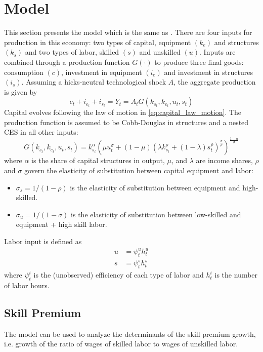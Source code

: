 \documentclass[12pt]{article}
\begin{document}
\pagebreak


\section{Model}\label{sec:model}

This section presents the model which is the same as \citep{krusell2000capital}. There are four inputs for production in this economy: two types of capital, equipment $(k_e)$ and structures $(k_s)$ and two types of labor, skilled $(s)$ and unskilled $(u)$. Inputs are combined through a production function $G(\cdot)$ to produce three final goods: consumption $(c)$, investment in equipment $(i_e)$ and investment in structures $(i_s)$. Assuming a hicks-neutral technological shock $A$, the aggregate production is given by
\begin{equation}\label{eq:production}
 c_t + i_{e_t} + i_{s_t} = Y_t = A_t G(k_{s_t}, k_{e_t}, u_t, s_t)
\end{equation}
Capital evolves following the law of motion in \eqref{eq:capital_law_motion}. The production function is assumed to be Cobb-Douglas in structures and a nested CES in all other inputs:
\begin{equation}\label{eq:production_fun}
 G(k_{s_t}, k_{e_t}, u_t, s_t) = k_{s_t}^\alpha\left( \mu u_t^\sigma + (1-\mu)\left(\lambda k_{s_t}^\rho + (1-\lambda)s_t^\rho\right)^\frac{\sigma}{\rho}\right)^\frac{1-\alpha}{\sigma}
\end{equation}
where $\alpha$ is the share of capital structures in output, $\mu$, and $\lambda$ are income shares, $\rho$ and $\sigma$ govern the elasticity of substitution between capital equipment and labor:
\begin{itemize}
 \item $\sigma_s = 1/(1-\rho)$ is the elasticity of substitution between equipment and high-skilled.
 \item $\sigma_u = 1/(1-\sigma)$ is the elasticity of substitution between low-skilled and equipment + high skill labor.
\end{itemize}
Labor input is defined as 
\begin{align*}
 u &= \psi^u_t h^u_t\\
 s &= \psi^s_t h^s_t
\end{align*}
where $\psi^i_t$ is the (unobserved) efficiency of each type of labor and $h^i_t$ is the number of labor hours. 

\subsection{Skill Premium}
The model can be used to analyze the determinants of the skill premium growth, i.e. growth of the ratio of wages of skilled labor to wages of unskilled labor. 
\end{document}
